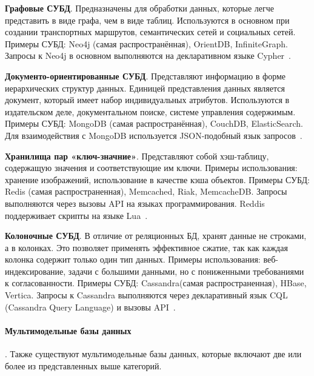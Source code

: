 \begin{compactitem}
      \item \textbf{Графовые СУБД}. Предназначены для обработки данных, которые легче представить в виде графа,
      чем в виде таблиц. Используются в основном при создании транспортных маршрутов,
      семантических сетей и социальных сетей. Примеры СУБД: Neo4j (самая распространённая),
      OrientDB, InfiniteGraph. Запросы к Neo4j в основном выполняются на декларативном языке
      Cypher~\cite{maranAlternativeApproachesData2020, savoskinIssledovanieSposobovPrimeneniya2019}.
      \item \textbf{Документо-ориентированные СУБД}. Представляют информацию в форме иерархических структур данных.
      Единицей представления данных является документ, который имеет набор индивидуальных атрибутов. Используются в
      издательском деле, документальном поиске, системе управления содержимым. Примеры СУБД:
      MongoDB (самая распространённая), CouchDB, ElasticSearch.
      Для взаимодействия с MongoDB используется JSON-подобный язык запросов~\cite{maranAlternativeApproachesData2020,
            savoskinIssledovanieSposobovPrimeneniya2019}.
      \item \textbf{Хранилища пар «ключ-значние»}. Представляют собой хэш-таблицу,
      содержащую значения и соответствующие им ключи. Примеры использования: хранение изображений,
      использование в качестве кэша объектов. Примеры СУБД: Redis (самая распространенная), Memcached, Riak, MemcacheDB.
      Запросы выполняются через вызовы API на языках программирования. Reddis поддерживает скрипты на языке
      Lua~\cite{ivanovObzorSovremennyhNoSQL2019,savoskinIssledovanieSposobovPrimeneniya2019}.
      \item \textbf{Колоночные СУБД}. В отличие от реляционных БД, хранят данные не строками, а в колонках. Это
      позволяет применять эффективное сжатие, так как каждая колонка содержит только один тип данных.
      Примеры использования: веб-индексирование, задачи с большими данными, но с пониженными требованиями
      к согласованности. Примеры СУБД: Cassandra(самая распространенная), HBase, Vertica.
      Запросы к Cassandra выполняются через декларативный язык CQL (Cassandra Query Language) и вызовы
      API~\cite{ivanovObzorSovremennyhNoSQL2019,savoskinIssledovanieSposobovPrimeneniya2019}.
\end{compactitem}

\paragraph{Мультимодельные базы данных}. Также существуют мультимодельные базы данных,
которые включают две или более из представленных выше категорий.

